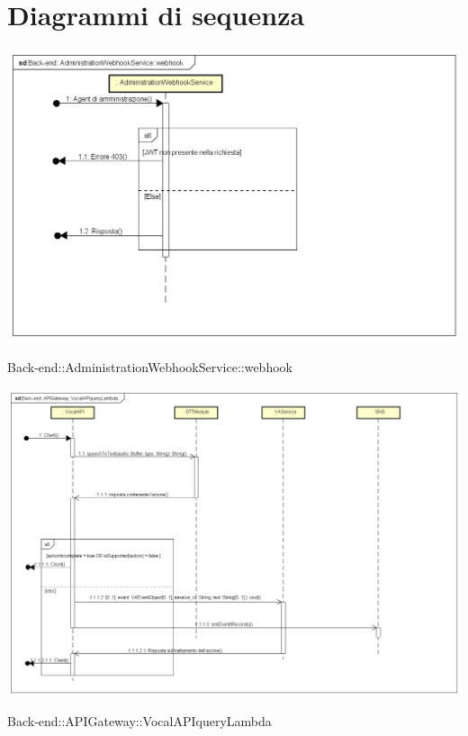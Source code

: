 \section{Diagrammi di sequenza}
\includegraphics[width=\textwidth,height=\textheight,keepaspectratio]{images/diagrams/back-end/Ufficial_Backend/Back-end__AdministrationWebhookService__webhook.png} 	\caption{Back-end::AdministrationWebhookService::webhook}
\includegraphics[width=\textwidth,height=\textheight,keepaspectratio]{images/diagrams/back-end/Ufficial_Backend/Back-end__APIGateway__VocalAPIqueryLambda.png} 	\caption{Back-end::APIGateway::VocalAPIqueryLambda}
